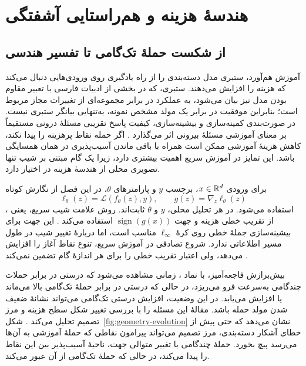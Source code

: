 \chapter{هندسهٔ هزینه و هم‌راستایی آشفتگی}
\label{ch:geometry}

\section{از شکست حملهٔ تک‌گامی تا تفسیر هندسی}
\label{sec:geometry-motivation}

آموزش هم‌آورد، ستبری مدل دسته‌بندی را از راه یادگیری روی ورودی‌هایی دنبال می‌کند که هزینه را افزایش می‌دهند. ستبری، که در بخشی از ادبیات فارسی با تعبیر مقاوم بودن مدل نیز بیان می‌شود، به عملکرد در برابر مجموعه‌ای از تغییرات مجاز مربوط است؛ بنابراین موفقیت در برابر یک مولد مشخص نمونه، به‌تنهایی بیانگر ستبری نیست. در صورت‌بندی کمینه‌سازی و بیشینه‌سازی، کیفیت پاسخ تقریبی مسئلهٔ درونی مستقیماً بر معنای آموزشی مسئلهٔ بیرونی اثر می‌گذارد \cite{madry2018towards}. اگر حمله نقاط پرهزینه را پیدا نکند، کاهش هزینهٔ آموزشی ممکن است همراه با باقی ماندن آسیب‌پذیری در همان همسایگی باشد. این تمایز در آموزش سریع اهمیت بیشتری دارد، زیرا یک گام مبتنی بر شیب تنها تصویری محلی از هندسهٔ هزینه در اختیار دارد.

برای ورودی $x\in\mathbb{R}^d$، برچسب $y$ و پارامترهای $\theta$، در این فصل از نگارش کوتاه
\begin{equation}
\ell_\theta(z)=\mathcal{L}(f_\theta(z),y),\qquad
g(z)=\nabla_z\ell_\theta(z)
\label{eq:geometry-loss}
\end{equation}
استفاده می‌شود. در هر تحلیل محلی، $y$ و $\theta$ ثابت‌اند. روش علامت شیب سریع، یعنی ، از تقریب خطی هزینه و جهت $\operatorname{sign}(g(x))$ استفاده می‌کند \cite{goodfellow2015explaining}. این جهت برای بیشینه‌سازی جملهٔ خطی روی کرهٔ $\ell_\infty$ مناسب است، اما دربارهٔ تغییر شیب در طول مسیر اطلاعاتی ندارد. شروع تصادفی در آموزش سریع، تنوع نقاط آغاز را افزایش می‌دهد، ولی اعتبار تقریب خطی را برای هر اندازهٔ گام تضمین نمی‌کند \cite{wong2020fast}.

بیش‌برازش فاجعه‌آمیز، با نماد ، زمانی مشاهده می‌شود که درستی در برابر حملات چندگامی به‌سرعت فرو می‌ریزد، در حالی که درستی در برابر حملهٔ تک‌گامی بالا می‌ماند یا افزایش می‌یابد. در این وضعیت، افزایش درستی تک‌گامی می‌تواند نشانهٔ ضعیف شدن مولد حمله باشد. مقالهٔ \sora{} این مسئله را با بررسی تغییر شکل سطح هزینه و مرز تصمیم تحلیل می‌کند \cite{sora2026}. شکل~\ref{fig:geometry-evolution} نشان می‌دهد که حتی پیش از خطای آشکار دسته‌بندی، مرز تصمیم می‌تواند پیرامون نقاطی که حملهٔ آموزشی به آن‌ها می‌رسد پیچ بخورد. حملهٔ چندگامی با تغییر متوالی جهت، ناحیهٔ آسیب‌پذیر بین این نقاط را پیدا می‌کند، در حالی که حملهٔ تک‌گامی از آن عبور می‌کند.

